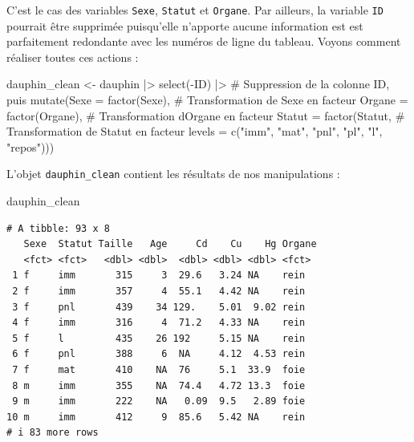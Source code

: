 \documentclass[
  a4paper,
  DIV=11,
  numbers=noendperiod,
  oneside]{scrreprt}
\newenvironment{Shaded}{}{}
\newcommand{\AttributeTok}[1]{\textcolor[rgb]{0.84,0.23,0.29}{#1}}
\newcommand{\CommentTok}[1]{\textcolor[rgb]{0.42,0.45,0.49}{#1}}
\newcommand{\FunctionTok}[1]{\textcolor[rgb]{0.44,0.26,0.76}{#1}}
\newcommand{\NormalTok}[1]{\textcolor[rgb]{0.14,0.16,0.18}{#1}}
\newcommand{\OtherTok}[1]{\textcolor[rgb]{0.44,0.26,0.76}{#1}}
\newcommand{\SpecialCharTok}[1]{\textcolor[rgb]{0.00,0.36,0.77}{#1}}
\newcommand{\StringTok}[1]{\textcolor[rgb]{0.01,0.18,0.38}{#1}}
\begin{document}
C'est le cas des variables \texttt{Sexe}, \texttt{Statut} et
\texttt{Organe}. Par ailleurs, la variable \texttt{ID} pourrait être
supprimée puisqu'elle n'apporte aucune information est est parfaitement
redondante avec les numéros de ligne du tableau. Voyons comment réaliser
toutes ces actions :

\begin{Shaded}
\begin{Highlighting}[]
\NormalTok{dauphin\_clean }\OtherTok{\textless{}{-}}\NormalTok{ dauphin }\SpecialCharTok{|\textgreater{}} 
  \FunctionTok{select}\NormalTok{(}\SpecialCharTok{{-}}\NormalTok{ID) }\SpecialCharTok{|\textgreater{}}                 \CommentTok{\# Suppression de la colonne ID, puis}
  \FunctionTok{mutate}\NormalTok{(}\AttributeTok{Sexe =} \FunctionTok{factor}\NormalTok{(Sexe),     }\CommentTok{\# Transformation de Sexe en facteur}
         \AttributeTok{Organe =} \FunctionTok{factor}\NormalTok{(Organe), }\CommentTok{\# Transformation d\textquotesingle{}Organe en facteur}
         \AttributeTok{Statut =} \FunctionTok{factor}\NormalTok{(Statut,  }\CommentTok{\# Transformation de Statut en facteur}
                         \AttributeTok{levels =} \FunctionTok{c}\NormalTok{(}\StringTok{"imm"}\NormalTok{, }\StringTok{"mat"}\NormalTok{, }\StringTok{"pnl"}\NormalTok{, }\StringTok{"pl"}\NormalTok{, }\StringTok{"l"}\NormalTok{, }\StringTok{"repos"}\NormalTok{)))}
\end{Highlighting}
\end{Shaded}

L'objet \texttt{dauphin\_clean} contient les résultats de nos
manipulations :

\begin{Shaded}
\begin{Highlighting}[]
\NormalTok{dauphin\_clean}
\end{Highlighting}
\end{Shaded}

\begin{verbatim}
# A tibble: 93 x 8
   Sexe  Statut Taille   Age     Cd    Cu    Hg Organe
   <fct> <fct>   <dbl> <dbl>  <dbl> <dbl> <dbl> <fct> 
 1 f     imm       315     3  29.6   3.24 NA    rein  
 2 f     imm       357     4  55.1   4.42 NA    rein  
 3 f     pnl       439    34 129.    5.01  9.02 rein  
 4 f     imm       316     4  71.2   4.33 NA    rein  
 5 f     l         435    26 192     5.15 NA    rein  
 6 f     pnl       388     6  NA     4.12  4.53 rein  
 7 f     mat       410    NA  76     5.1  33.9  foie  
 8 m     imm       355    NA  74.4   4.72 13.3  foie  
 9 m     imm       222    NA   0.09  9.5   2.89 foie  
10 m     imm       412     9  85.6   5.42 NA    rein  
# i 83 more rows
\end{verbatim}
\end{document}
